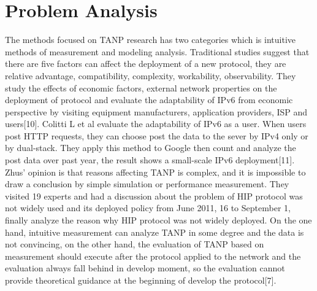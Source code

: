 \documentclass{article}
\begin{document}
\section{Problem Analysis}
The methods focused on TANP research  has two categories which is  intuitive methods of measurement and  modeling analysis. 
Traditional studies suggest that there are five factors can affect the deployment of a new protocol, they are relative advantage, compatibility, complexity, workability, observability. They study the effects of  economic factors, external network properties on the deployment of 
protocol and evaluate the adaptability of IPv6 from economic perspective by visiting equipment manufacturers, application 
providers, ISP and users[10]. Colitti L et al evaluate the adaptability of IPv6 as a user. When users post HTTP requests, 
they can choose post the data to the sever by IPv4 only or by dual-stack. They apply this method to Google then count and 
analyze the post data over past year,  the result shows a small-scale IPv6 deployment[11]. Zhus' opinion is that reasons 
affecting TANP is complex, and it is impossible to draw a conclusion by simple simulation or performance measurement. They 
visited 19 experts and had a discussion about the problem of HIP protocol was not widely used and its deployed policy from 
June 2011, 16 to September 1, finally analyze the reason why HIP protocol was not widely deployed.  On the one hand, intuitive 
measurement can analyze TANP in some degree and the data is not convincing,  on the other hand, the evaluation of TANP based on 
measurement should execute after the protocol applied to the network and the evaluation always fall behind in develop moment, 
so the evaluation cannot provide theoretical guidance at the beginning of develop the protocol[7].
\end{document}

